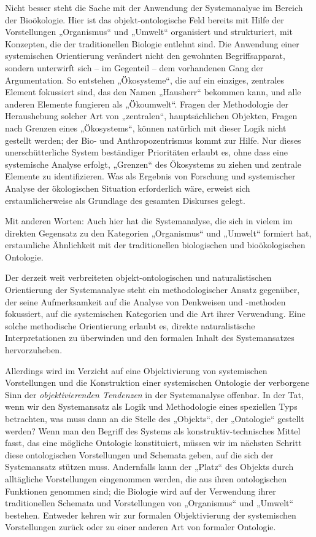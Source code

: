 \documentclass[11pt,a4paper]{article}
\begin{document}
Nicht besser steht die Sache mit der Anwendung der Systemanalyse im Bereich
der Bioöko\-logie. Hier ist das objekt-ontologische Feld bereits mit Hilfe der
Vorstellungen „Organismus“ und „Umwelt“ organisiert und strukturiert, mit
Konzepten, die der traditionellen Biologie entlehnt sind. Die Anwendung einer
systemischen Orientierung verändert nicht den gewohnten Begriffsapparat,
sondern unterwirft sich -- im Gegenteil -- dem vorhandenen Gang der
Argumentation. So entstehen „Ökosysteme“, die auf ein einziges, zentrales
Element fokussiert sind, das den Namen „Hausherr“ bekommen kann, und alle
anderen Elemente fungieren als „Ökoumwelt“. Fragen der Methodologie der
Heraushebung solcher Art von „zentralen“, hauptsächlichen Objekten, Fragen
nach Grenzen eines „Ökosystems“, können natürlich mit dieser Logik nicht
gestellt werden; der Bio- und Anthropozentrismus kommt zur Hilfe. Nur dieses
unerschütterliche System beständiger Prioritäten erlaubt es, ohne dass eine
systemische Analyse erfolgt, „Grenzen“ des Ökosystems zu ziehen und zentrale
Elemente zu identifizieren. Was als Ergebnis von Forschung und systemischer
Analyse der ökologischen Situation erforderlich wäre, erweist sich
erstaunlicherweise als Grundlage des gesamten Diskurses gelegt.

Mit anderen Worten: Auch hier hat die Systemanalyse, die sich in vielem im
direkten Gegensatz zu den Kategorien „Organismus“ und „Umwelt“ formiert hat,
erstaunliche Ähnlichkeit mit der traditionellen biologischen und
bioökologischen Ontologie.

Der derzeit weit verbreiteten objekt-ontologischen und naturalistischen
Orientierung der Systemanalyse steht ein methodologischer Ansatz gegenüber,
der seine Aufmerksamkeit auf die Analyse von Denkweisen und -methoden
fokussiert, auf die systemischen Kategorien und die Art ihrer Verwendung.
Eine solche methodische Orientierung erlaubt es, direkte naturalistische
Interpretationen zu überwinden und den formalen Inhalt des Systemansatzes
hervorzuheben.

Allerdings wird im Verzicht auf eine Objektivierung von systemischen
Vorstellungen und die Konstruktion einer systemischen Ontologie der verborgene
Sinn der \emph{objektivierenden Tendenzen} in der Systemanalyse offenbar. In
der Tat, wenn wir den Systemansatz als Logik und Methodologie eines speziellen
Typs betrachten, was muss dann an die Stelle des „Objekts“, der „Ontologie“
gestellt werden?  Wenn man den Begriff des Systems als konstruktiv-technisches
Mittel fasst, das eine mögliche Ontologie konstituiert, müssen wir im nächsten
Schritt diese ontologischen Vorstellungen und Schemata geben, auf die sich der
Systemansatz stützen muss. Andernfalls kann der „Platz“ des Objekts durch
alltägliche Vorstellungen eingenommen werden, die aus ihren ontologischen
Funktionen genommen sind; die Biologie wird auf der Verwendung ihrer
traditionellen Schemata und Vorstellungen von „Organismus“ und „Umwelt“
bestehen. Entweder kehren wir zur formalen Objektivierung der systemischen
Vorstellungen zurück oder zu einer anderen Art von formaler Ontologie.
\end{document}
